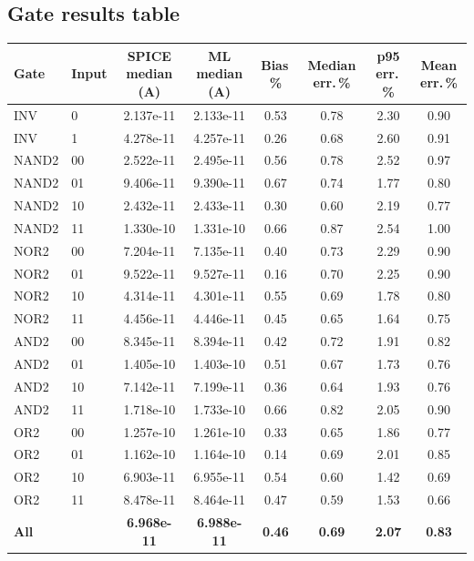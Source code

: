 \documentclass[10pt]{article}
\begin{document}
\subsection*{Gate results table}

\begin{table}[H]
\centering
\small
\begin{tabular}{@{}llcccccc@{}}
\toprule
Gate & Input & SPICE median (A) & ML median (A) & Bias\,\% & Median err.\,\% & p95 err.\,\% & Mean err.\,\% \\
\midrule
INV & 0 & 2.137e-11 & 2.133e-11 & 0.53 & 0.78 & 2.30 & 0.90 \\
INV & 1 & 4.278e-11 & 4.257e-11 & 0.26 & 0.68 & 2.60 & 0.91 \\
\midrule
NAND2 & 00 & 2.522e-11 & 2.495e-11 & 0.56 & 0.78 & 2.52 & 0.97 \\
NAND2 & 01 & 9.406e-11 & 9.390e-11 & 0.67 & 0.74 & 1.77 & 0.80 \\
NAND2 & 10 & 2.432e-11 & 2.433e-11 & 0.30 & 0.60 & 2.19 & 0.77 \\
NAND2 & 11 & 1.330e-10 & 1.331e-10 & 0.66 & 0.87 & 2.54 & 1.00 \\
\midrule
NOR2 & 00 & 7.204e-11 & 7.135e-11 & 0.40 & 0.73 & 2.29 & 0.90 \\
NOR2 & 01 & 9.522e-11 & 9.527e-11 & 0.16 & 0.70 & 2.25 & 0.90 \\
NOR2 & 10 & 4.314e-11 & 4.301e-11 & 0.55 & 0.69 & 1.78 & 0.80 \\
NOR2 & 11 & 4.456e-11 & 4.446e-11 & 0.45 & 0.65 & 1.64 & 0.75 \\
\midrule
AND2 & 00 & 8.345e-11 & 8.394e-11 & 0.42 & 0.72 & 1.91 & 0.82 \\
AND2 & 01 & 1.405e-10 & 1.403e-10 & 0.51 & 0.67 & 1.73 & 0.76 \\
AND2 & 10 & 7.142e-11 & 7.199e-11 & 0.36 & 0.64 & 1.93 & 0.76 \\
AND2 & 11 & 1.718e-10 & 1.733e-10 & 0.66 & 0.82 & 2.05 & 0.90 \\
\midrule
OR2 & 00 & 1.257e-10 & 1.261e-10 & 0.33 & 0.65 & 1.86 & 0.77 \\
OR2 & 01 & 1.162e-10 & 1.164e-10 & 0.14 & 0.69 & 2.01 & 0.85 \\
OR2 & 10 & 6.903e-11 & 6.955e-11 & 0.54 & 0.60 & 1.42 & 0.69 \\
OR2 & 11 & 8.478e-11 & 8.464e-11 & 0.47 & 0.59 & 1.53 & 0.66 \\
\midrule
\textbf{All} & & \textbf{6.968e-11} & \textbf{6.988e-11} & \textbf{0.46} & \textbf{0.69} & \textbf{2.07} & \textbf{0.83} \\
\bottomrule
\end{tabular}
\end{table}
\end{document}
